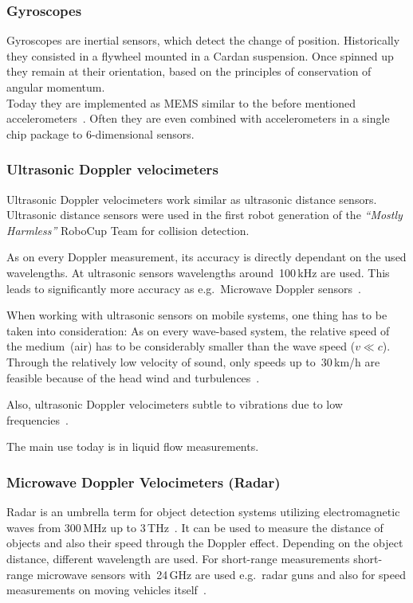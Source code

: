\documentclass[12pt,a4paper]{article}
\newcommand{\MH}{\emph{``Mostly Harmless''} RoboCup Team\xspace}
\begin{document}
\subsubsection{Gyroscopes}

Gyroscopes are inertial sensors, which detect the change of position.
Historically they consisted in a flywheel mounted in a Cardan suspension.
Once spinned up they remain at their orientation, based on the principles of conservation of angular momentum.\\
Today they are implemented as MEMS similar to  the before mentioned accelerometers~\cite{pmt}.
Often they are even combined with accelerometers in a single chip package to 6-dimensional sensors.


\subsubsection{Ultrasonic Doppler velocimeters}

Ultrasonic Doppler velocimeters work similar as ultrasonic distance sensors.
Ultrasonic distance sensors were used in the first robot generation of the \MH for collision detection.

As on every Doppler measurement, its accuracy is directly dependant on the used wavelengths.
At ultrasonic sensors wavelengths around~100\,kHz are used. 
This leads to significantly more accuracy as e.g.\ Microwave Doppler sensors~\cite{ultrasonic}.

When working with ultrasonic sensors on mobile systems, one thing has to be taken into consideration: 
As on every wave-based system, the relative speed of the medium~(air) has to be considerably smaller than the wave speed ($v \ll c$).
Through the relatively low velocity of sound, only speeds up to~30\,km/h are feasible because of the head wind and turbulences~\cite{ultrasonic}.

Also, ultrasonic Doppler velocimeters subtle to vibrations due to low frequencies~\cite{agri}.

The main use today is in liquid flow measurements.



\subsubsection{Microwave Doppler Velocimeters (Radar)}

Radar is an umbrella term for object detection systems utilizing electromagnetic waves from 300\,MHz up to 3\,THz~\cite{nrt}.
It can be used to measure the distance of objects and also their speed through the Doppler effect.
Depending on the object distance, different wavelength are used.
For short-range measurements short-range microwave sensors with~24\,GHz are used e.g.\ radar guns and also for speed measurements on moving vehicles itself~\cite{s_r_radar}.
\end{document}
